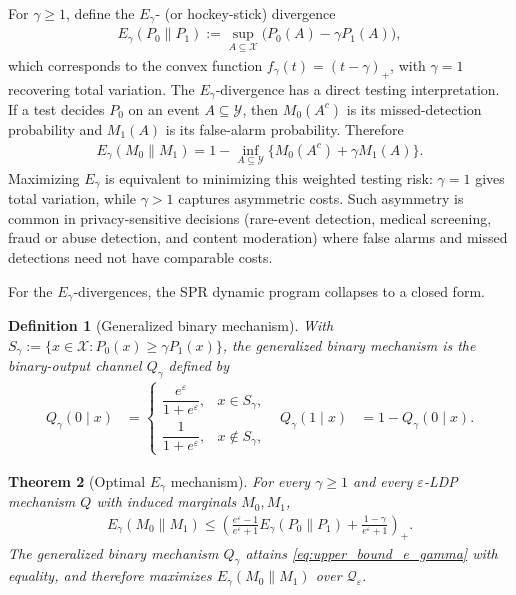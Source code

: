 \documentclass{article}
\theoremstyle{plain}
\newtheorem{theorem}{Theorem}[section]
\newtheorem{definition}[theorem]{Definition}
\theoremstyle{definition}
\theoremstyle{plain}
\newcommand{\eps}{\varepsilon}
\newcommand{\X}{\mathcal{X}}
\newcommand{\Y}{\mathcal{Y}}
\begin{document}
For $\gamma\ge 1$, define the $E_\gamma$- (or hockey-stick) divergence
\begin{align}
    E_\gamma(P_0 \| P_1) := \sup_{A\subseteq\X} \bigl( P_0(A) - \gamma P_1(A) \bigr),
\end{align}
which corresponds to the convex function $f_\gamma(t) = (t-\gamma)_+$, with $\gamma=1$ recovering total variation. The $E_\gamma$-divergence has a direct testing interpretation. If a test decides $P_0$ on an event $A\subseteq\Y$, then $M_0(A^c)$ is its missed-detection probability and $M_1(A)$ is its false-alarm probability. Therefore
\begin{align}
    E_\gamma(M_0\|M_1)
    =
    1-\inf_{A\subseteq\Y}\{M_0(A^c)+\gamma M_1(A)\}.
\end{align}
Maximizing $E_\gamma$ is equivalent to minimizing this weighted testing risk: $\gamma=1$ gives total variation, while $\gamma>1$ captures asymmetric costs. Such asymmetry is common in privacy-sensitive decisions (rare-event detection, medical screening, fraud or abuse detection, and content moderation) where false alarms and missed detections need not have comparable costs.

For the $E_\gamma$-divergences, the SPR dynamic program collapses to a closed form.

\begin{definition}[Generalized binary mechanism]
\label{def:generalized-binary-mechanism}
With $S_\gamma := \{ x \in \X : P_0(x) \ge \gamma P_1(x) \}$, the \emph{generalized binary mechanism} is the binary-output channel $Q_\gamma$ defined by
\begin{align}
    Q_\gamma(0 \mid x) &= \begin{cases}
        \dfrac{e^\eps}{1 + e^\eps}, & x \in S_\gamma, \\[1.6ex]
        \dfrac{1}{1 + e^\eps},      & x \notin S_\gamma,
    \end{cases}
    & Q_\gamma(1 \mid x) &= 1 - Q_\gamma(0 \mid x).
\end{align}
\end{definition}

\begin{theorem}[Optimal $E_\gamma$ mechanism]
\label{thm:optimal-egamma}
For every $\gamma \ge 1$ and every $\eps$-LDP mechanism $Q$ with induced marginals $M_0, M_1$,
\begin{align}
    \label{eq:upper_bound_e_gamma}
    E_\gamma(M_0 \| M_1)
    \le
    \left(
        \frac{e^\eps - 1}{e^\eps + 1} E_\gamma(P_0 \| P_1)
        + \frac{1 - \gamma}{e^\eps + 1}
    \right)_+ .
\end{align}
The generalized binary mechanism $Q_\gamma$ attains \eqref{eq:upper_bound_e_gamma} with equality, and therefore maximizes $E_\gamma(M_0 \| M_1)$ over $\mathcal Q_\eps$.
\end{theorem}
\end{document}
